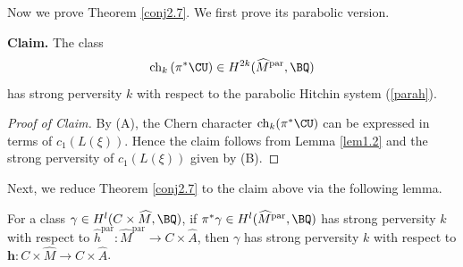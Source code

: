 Now we prove Theorem \ref{conj2.7}. We first prove its parabolic version.


 {\bf Claim.} The class
\[
\mathrm{ch}_k\left(\pi^* \CU\right) \in H^{2k}(\widehat{M}^{\mathrm{par}}, \BQ)
\]
has strong perversity $k$ with respect to the parabolic Hitchin system (\ref{parah}).

\begin{proof}[Proof of Claim]
By (A), the Chern character $\mathrm{ch}_k(\pi^*\CU)$ can be expressed in terms of $c_1(L(\xi))$. Hence the claim follows from Lemma \ref{lem1.2} and the strong perversity of $c_1(L(\xi))$ given by (B).
\end{proof}


Next, we reduce Theorem \ref{conj2.7} to the claim above via the following lemma.

\begin{lem}
\notready
For a class $\gamma \in H^l(C \times \widehat{M}, \BQ)$, if $\pi^*\gamma \in H^l(\widehat{M}^{\mathrm{par}}, \BQ)$ has strong perversity $k$ with respect to $\widehat{h}^{\mathrm{par}}: \widehat{M}^{\mathrm{par}} \to C\times \widehat{A}$, then $\gamma$ has strong perversity $k$ with respect to ${\mathbf{h}} : C\times \widehat{M} \to C\times \widehat{A}$.
\end{lem}

